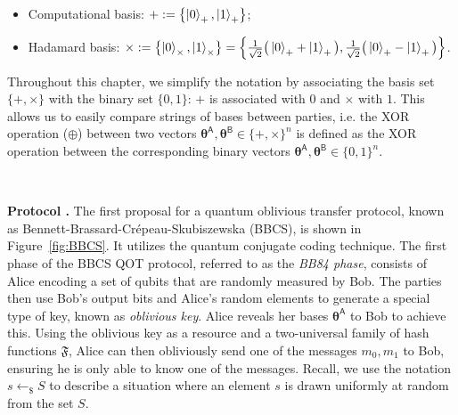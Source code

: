 \begin{itemize}
    \item Computational basis: $+ := \left\{\ket{0}_{+}, \ket{1}_{+}\right\}$;
    \item Hadamard basis: $\times := \left\{\ket{0}_{\times}, \ket{1}_{\times}\right\} = \left\{\frac{1}{\sqrt{2}}\big( \ket{0}_{+} + \ket{1}_{+} \big), \frac{1}{\sqrt{2}}\big( \ket{0}_{+} - \ket{1}_{+} \big) \right\}$.
\end{itemize}

Throughout this chapter, we simplify the notation by associating the basis set $\{+,\times\}$ with the binary set $\{0,1\}$: $+$ is associated with $0$ and $\times$ with $1$. This allows us to easily compare strings of bases between parties, i.e. the XOR operation ($\oplus$) between two vectors $\bm{\theta}^{\mathsf{A}}, \bm{\theta}^{\mathsf{B}} \in\{+,\times\}^n$ is defined as the XOR operation between the corresponding binary vectors $\bm{\theta}^{\mathsf{A}}, \bm{\theta}^{\mathsf{B}} \in\{0,1\}^n$.

\

\noindent\textbf{Protocol \cite{BBCS92}.} The first proposal for a quantum oblivious transfer protocol, known as Bennett-Brassard-Crépeau-Skubiszewska (BBCS), is shown in Figure~\ref{fig:BBCS}. It utilizes the quantum conjugate coding technique. The first phase of the BBCS QOT protocol, referred to as the \textit{BB84 phase}, consists of Alice encoding a set of qubits that are randomly measured by Bob. The parties then use Bob's output bits and Alice's random elements to generate a special type of key, known as \textit{oblivious key}. Alice reveals her bases $\bm{\theta}^{\mathsf{A}}$ to Bob to achieve this. Using the oblivious key as a resource and a two-universal family of hash functions $\mathfrak{F}$, Alice can then obliviously send one of the messages $m_0, m_1$ to Bob, ensuring he is only able to know one of the messages. Recall, we use the notation $s\leftarrow_{\$}S$ to describe a situation where an element $s$ is drawn uniformly at random from the set $S$.

